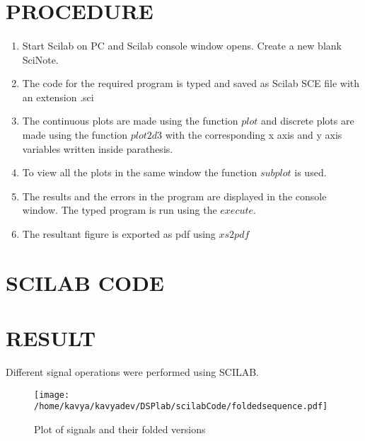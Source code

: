 \section{PROCEDURE}

\paragraph{}
\begin{enumerate}
\item
Start Scilab on PC and Scilab console window opens. Create a new blank SciNote.
\item
The code for the required program is typed and saved as Scilab SCE file with an extension .sci
\item

The continuous plots are made using the function $plot$ and discrete plots are made using the function $plot2d3$ with the corresponding x axis and y axis variables written inside parathesis.

\item
To view all the plots in the same window the function $subplot$ is used.
\item
The results and the errors in the program are displayed in the console window.
The typed program is run using the $execute$.
\item
The resultant figure is exported as pdf using $xs2pdf$
\end{enumerate}

\section{SCILAB CODE}
















\section{RESULT}
Different signal operations were performed using SCILAB.
\begin{figure}
\texttt{[image: /home/kavya/kavyadev/DSPlab/scilabCode/foldedsequence.pdf]}
\caption{Plot of signals and their folded versions}
\label{folded}
\end{figure}

